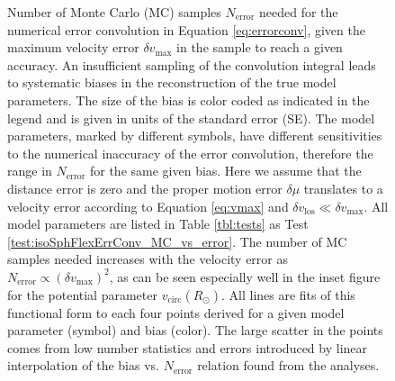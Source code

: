 
\begin{figure}
\caption{Number of Monte Carlo (MC) samples $N_\text{error}$ needed for the numerical error convolution in Equation \ref{eq:errorconv}, given the maximum velocity error $\delta v_\text{max}$ in the sample to reach a given accuracy.  An insufficient sampling of the convolution integral leads to systematic biases in the reconstruction of the true model parameters. The size of the bias is color coded as indicated in the legend and is given in units of the standard error (SE).  The model parameters, marked by different symbols, have different sensitivities to the numerical inaccuracy of the error convolution, therefore the range in $N_\text{error}$ for the same given bias. Here we assume that the distance error is zero and the proper motion error $\delta \mu$ translates to a velocity error according to Equation \ref{eq:vmax} and $\delta v_\text{los} \ll \delta v_\text{max}$. All model parameters are listed in Table \ref{tbl:tests} as Test \ref{test:isoSphFlexErrConv_MC_vs_error}. The number of MC samples needed increases with the velocity error as $N_\text{error} \propto \left( \delta v_\text{max} \right)^2$, as can be seen especially well in the inset figure for the potential parameter $v_\text{circ}(R_\odot)$. All lines are fits of this functional form to each four points derived for a given model parameter (symbol) and bias (color). The large scatter in the points comes from low number statistics and errors introduced by linear interpolation of the bias vs. $N_\text{error}$ relation found from the analyses. }
\label{fig:isoSphFlexErrConv_MC_vs_error}
\end{figure}



